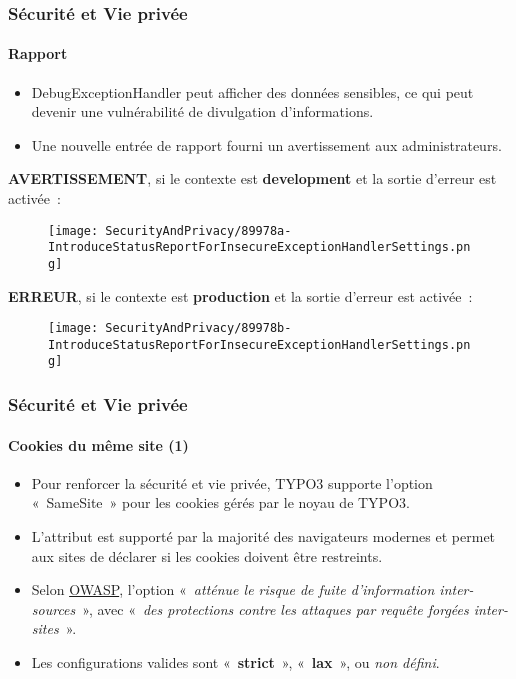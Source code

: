 \begin{frame}[fragile]
	\frametitle{Sécurité et Vie privée}
	\framesubtitle{Rapport}

	\begin{itemize}
		\item DebugExceptionHandler peut afficher des données sensibles, ce qui
			peut devenir une vulnérabilité de divulgation d'informations.
		\item Une nouvelle entrée de rapport fourni un avertissement aux administrateurs.
	\end{itemize}

	\vspace{0.4cm}
	\textbf{AVERTISSEMENT}, si le contexte est \textbf{development} et la sortie d'erreur est activée~:
	\begin{figure}
		\texttt{[image: SecurityAndPrivacy/89978a-IntroduceStatusReportForInsecureExceptionHandlerSettings.png]}
	\end{figure}

	\textbf{ERREUR}, si le contexte est \textbf{production} et la sortie d'erreur est activée~:
	\begin{figure}
		\texttt{[image: SecurityAndPrivacy/89978b-IntroduceStatusReportForInsecureExceptionHandlerSettings.png]}
	\end{figure}

\end{frame}


\begin{frame}[fragile]
	\frametitle{Sécurité et Vie privée}
	\framesubtitle{Cookies du même site (1)}

	\begin{itemize}
		\item Pour renforcer la sécurité et vie privée, TYPO3 supporte l'option «~SameSite~»
			pour les cookies gérés par le noyau de TYPO3.
		\item L'attribut est supporté par la majorité des navigateurs modernes et permet aux sites
			de déclarer si les cookies doivent être restreints.
		\item Selon
			\href{https://www.owasp.org/index.php/SameSite}{OWASP}, l'option\newline
			\small
				«~\textit{atténue le risque de fuite d'information inter-sources}~», avec\newline
				«~\textit{des protections contre les attaques par requête forgées inter-sites}~».
			\normalsize

		\item Les configurations valides sont «~\textbf{strict}~», «~\textbf{lax}~», ou \textit{non défini}.
	\end{itemize}

\end{frame}

